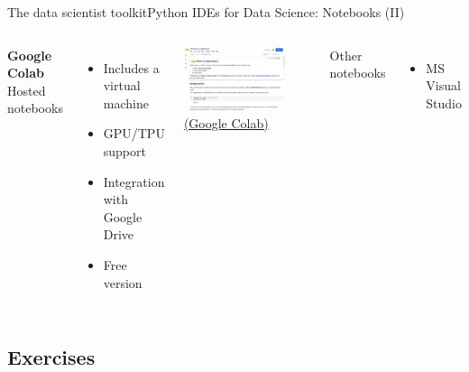 \documentclass[10pt,compress]{beamer} %
\begin{document}
\begin{frame}{The data scientist toolkit}{Python IDEs for Data Science: Notebooks (II)}
    \begin{columns}[t]
	   \centering \textbf{Google Colab}\\
		\flushleft Hosted notebooks\\
	\begin{itemize}
		\item Includes a virtual machine
		\item GPU/TPU support
		\item Integration with Google Drive
		\item Free version
	\end{itemize}

		\includegraphics[width=0.8\textwidth]{figs/colab.jpg}	\\

		\href{https://colab.research.google.com/}{(Google Colab)}

	   Other notebooks
		\begin{itemize}
			\item MS Visual Studio
		\end{itemize}
	\end{columns}
\end{frame}

\subsection{Exercises}
\end{document}
